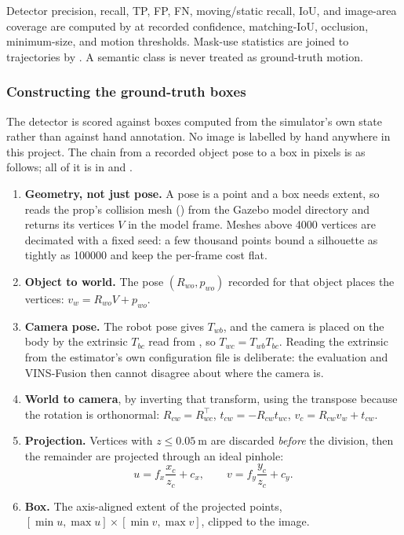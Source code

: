 Detector precision, recall, TP, FP, FN, moving/static recall, IoU, and image-area
coverage are computed by  at recorded confidence, matching-IoU,
occlusion, minimum-size, and motion thresholds. Mask-use statistics are joined to
trajectories by . A semantic class is never treated as
ground-truth motion.

\subsubsection{Constructing the ground-truth boxes}
\label{sec:yolo-gt-projection}

The detector is scored against boxes computed from the simulator's own state
rather than against hand annotation. No image is labelled by hand anywhere in
this project. The chain from a recorded object pose to a box in pixels is as
follows; all of it is in  and .

\begin{enumerate}[leftmargin=1.6em]
  \item \textbf{Geometry, not just pose.} A pose is a point and a box needs
    extent, so  reads the prop's collision mesh
    () from the Gazebo model directory and returns its vertices
    $V$ in the model frame. Meshes above \num{4000} vertices are decimated with
    a fixed seed: a few thousand points bound a silhouette as tightly as
    \num{100000} and keep the per-frame cost flat.
  \item \textbf{Object to world.} The pose $(R_{wo}, p_{wo})$ recorded for that
    object places the vertices: $v_w = R_{wo} V + p_{wo}$.
  \item \textbf{Camera pose.} The robot pose gives $T_{wb}$, and the camera is
    placed on the body by the extrinsic $T_{bc}$ read from
    , so $T_{wc} = T_{wb} T_{bc}$. Reading
    the extrinsic from the estimator's own configuration file is deliberate: the
    evaluation and VINS-Fusion then cannot disagree about where the camera is.
  \item \textbf{World to camera}, by inverting that transform, using the
    transpose because the rotation is orthonormal:
    $R_{cw} = R_{wc}^{\top}$, $t_{cw} = -R_{cw} t_{wc}$, $v_c = R_{cw} v_w +
    t_{cw}$.
  \item \textbf{Projection.} Vertices with $z \le \SI{0.05}{\metre}$ are
    discarded \emph{before} the division, then the remainder are projected
    through an ideal pinhole:
    \begin{equation}
      u = f_x \frac{x_c}{z_c} + c_x, \qquad
      v = f_y \frac{y_c}{z_c} + c_y .
      \label{eq:pinhole}
    \end{equation}
  \item \textbf{Box.} The axis-aligned extent of the projected points,
    $[\min u, \max u] \times [\min v, \max v]$, clipped to the image.
\end{enumerate}

